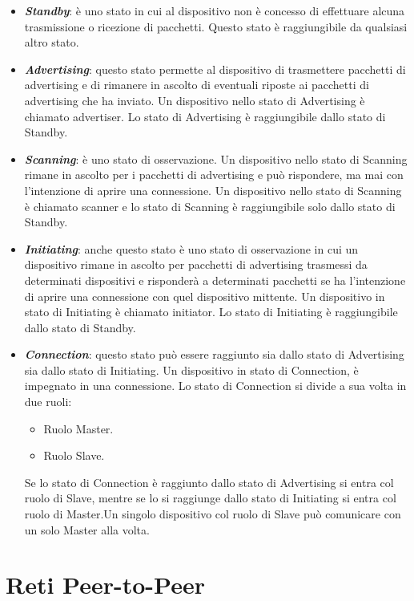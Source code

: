\begin{itemize}
	\item \textit{\textbf{Standby}}: è uno stato in cui al dispositivo non è concesso di effettuare alcuna trasmissione o ricezione di pacchetti. Questo stato è raggiungibile da qualsiasi altro stato.
	\item \textbf{\textit{Advertising}}: questo stato permette al dispositivo di  trasmettere pacchetti di advertising e di rimanere in ascolto di eventuali riposte ai pacchetti di advertising che ha inviato. Un dispositivo nello stato di Advertising è chiamato advertiser. Lo stato di Advertising è raggiungibile dallo stato di Standby.
	\item \textbf{\textit{Scanning}}: è uno stato di osservazione. Un dispositivo nello stato di Scanning rimane in ascolto per i pacchetti di advertising e può rispondere, ma mai con l'intenzione di aprire una connessione. Un dispositivo nello stato di Scanning è chiamato scanner e lo stato di Scanning è raggiungibile solo dallo stato di Standby.
	\item \textbf{\textit{Initiating}}: anche questo stato è uno stato di osservazione in cui un dispositivo rimane in ascolto per pacchetti di advertising trasmessi da determinati dispositivi e risponderà a determinati pacchetti se ha l'intenzione di aprire una connessione con quel dispositivo mittente. Un dispositivo in stato di Initiating è chiamato initiator. Lo stato di Initiating è raggiungibile dallo stato di Standby.
	\item \textbf{\textit{Connection}}: questo stato può essere raggiunto sia dallo stato di Advertising sia dallo stato di Initiating. Un dispositivo in stato di Connection, è impegnato in una connessione. Lo stato di Connection si divide a sua volta in due ruoli:
	\begin{itemize}
		\item Ruolo Master.
		\item Ruolo Slave.
	\end{itemize}
	Se lo stato di Connection è raggiunto dallo stato di Advertising si entra col ruolo di Slave, mentre se lo si raggiunge dallo stato di Initiating si entra col ruolo di Master.Un singolo dispositivo col ruolo di Slave può comunicare con un solo Master alla volta.
\end{itemize}

\section{Reti Peer-to-Peer}
